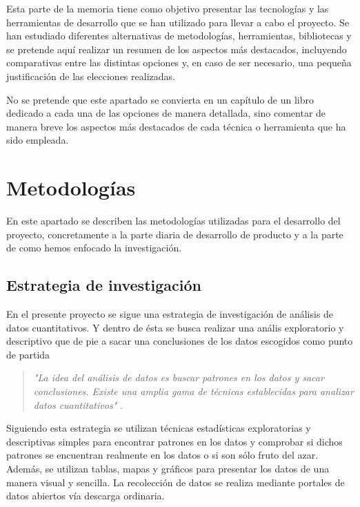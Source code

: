 
Esta parte de la memoria tiene como objetivo presentar las tecnologías y las herramientas de desarrollo que se han utilizado para llevar a cabo el proyecto. Se han estudiado diferentes alternativas de metodologías, herramientas, bibliotecas  y se pretende aquí realizar un resumen de los aspectos más destacados, incluyendo comparativas entre las distintas opciones y, en caso de ser necesario, una pequeña justificación de las elecciones realizadas. 

No se pretende que este apartado se convierta en un capítulo de un libro dedicado a cada una de las opciones de manera detallada, sino comentar de manera breve los aspectos más destacados de cada técnica o herramienta que ha sido empleada.

\section{Metodologías}\label{metodologias}
En este apartado se describen las metodologías utilizadas para el desarrollo del proyecto, concretamente a la parte diaria de desarrollo de producto y a la parte de como hemos enfocado la investigación.

\subsection{Estrategia de investigación}
En el presente proyecto se sigue una estrategia de investigación de análisis de datos cuantitativos. Y dentro de ésta se busca realizar una anális exploratorio y descriptivo que de pie a sacar una conclusiones de los datos escogidos como punto de partida

\begin{quote}
\textit{"La idea del análisis de datos es buscar patrones en los datos y sacar conclusiones. Existe una amplia gama de técnicas establecidas para analizar datos cuantitativos"} \cite{oates_researching_2006}. 
\end{quote}

Siguiendo esta estrategia se utilizan técnicas estadísticas exploratorias y descriptivas simples para encontrar patrones en los datos y comprobar si dichos patrones se encuentran realmente en los datos o si son sólo fruto del azar. Además, se utilizan tablas, mapas y gráficos para presentar los datos de una manera visual y sencilla. La recolección de datos se realiza mediante portales de datos abiertos vía descarga ordinaria. 

